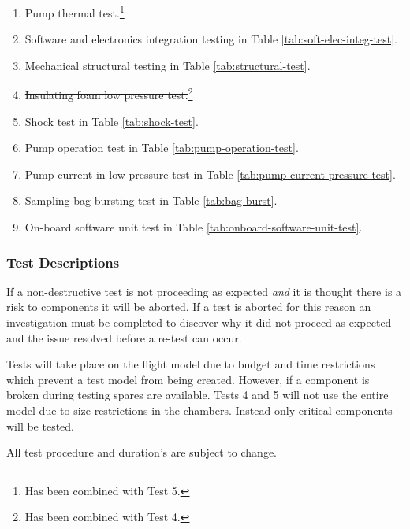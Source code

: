 \begin{enumerate}
    \item \st{Pump thermal test.}\footnote{Has been combined with Test 5.\label{fn:test-combined5}}
    \item Software and electronics integration testing in Table \ref{tab:soft-elec-integ-test}.
    \item Mechanical structural testing in Table \ref{tab:structural-test}.
    \item \st{Insulating foam low pressure test.}\footnote{Has been combined with Test 4.\label{fn:test-combined4}}
    \item Shock test in Table \ref{tab:shock-test}.
    \item Pump operation test in Table \ref{tab:pump-operation-test}.
    \item Pump current in low pressure test in Table \ref{tab:pump-current-pressure-test}.
    \item Sampling bag bursting test in Table \ref{tab:bag-burst}.
    \item On-board software unit test in Table \ref{tab:onboard-software-unit-test}.
\end{enumerate}

\subsubsection{Test Descriptions}

If a non-destructive test is not proceeding as expected \textit{and} it is thought there is a risk to components it will be aborted. If a test is aborted for this reason an investigation must be completed to discover why it did not proceed as expected and the issue resolved before a re-test can occur.

Tests will take place on the flight model due to budget and time restrictions which prevent a test model from being created. However, if a component is broken during testing spares are available. Tests 4 and 5 will not use the entire model due to size restrictions in the chambers. Instead only critical components will be tested.

All test procedure and duration's are subject to change.

